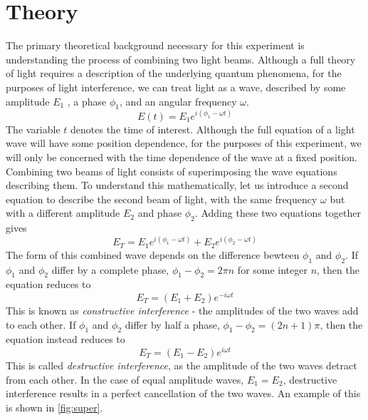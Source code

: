   \section{Theory}
  The primary theoretical background necessary for this experiment is understanding the process of combining two light beams. Although a full theory of light requires a description of the underlying quantum phenomena, for the purposes of light interference, we can treat light as a wave, described by some amplitude $E_1$ , a phase $\phi_1$, and an angular frequency $\omega$.
  \begin{equation}
    E(t) = E_1 e^{i(\phi_1 - \omega t)}
  \end{equation}
  The variable $t$ denotes the time of interest. Although the full equation of a light wave will have some position dependence, for the purposes of this experiment, we will only be concerned with the time dependence of the wave at a fixed position. Combining two beams of light consists of superimposing the wave equations describing them. To understand this mathematically, let us introduce a second equation to describe the second beam of light, with the same frequency $\omega$ but with a different amplitude $E_2$ and phase $\phi_2$.
  Adding these two equations together gives
  \begin{equation}
    E_T =  E_1 e^{i(\phi_1 - \omega t)}+  E_2 e^{i(\phi_2 - \omega t)}
  \end{equation}
  The form of this combined wave depends on the difference bewteen $\phi_1$ and $\phi_2$. If $\phi_1$ and $\phi_2$ differ by a complete phase, $\phi_1 - \phi_2 = 2\pi n $ for some integer $n$, then the equation reduces to
  \begin{equation}
    E_T = (E_1 + E_2) e^{-i\omega t}
  \end{equation}
  This is known as \textit{constructive interference} - the amplitudes of the two waves add to each other. If $\phi_1$ and $\phi_2$ differ by half a phase, $\phi_1 - \phi_2 = (2n + 1)\pi$, then the equation instead reduces to
  \begin{equation}
    E_T = (E_1 - E_2) e^{i \omega t}
  \end{equation}
  This is called \textit{destructive interference}, as the amplitude of the two waves detract from each other. In the case of equal amplitude waves, $E_1 = E_2$, destructive interference results in a perfect cancellation of the two waves. An example of this is shown in \ref{fig:super}.
